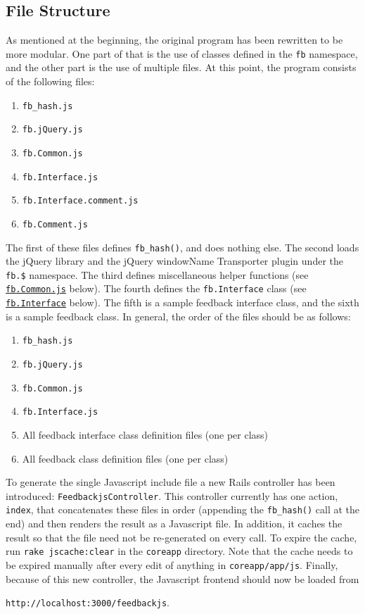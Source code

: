 \documentclass[letterpaper,12pt]{article}
\newcommand{\fb}[1]{\texttt{fb#1}}
\newcommand{\fbhash}[1]{\texttt{fb\_hash#1}}
\newcommand{\code}[1]{{\tt #1}}
\begin{document}
\subsection{File Structure}
\label{sec:init:file structure}
As mentioned at the beginning, the original program has been rewritten to be more modular.  One part of that is the use of classes defined in the \fb{} namespace, and the other part is the use of multiple files.  At this point, the program consists of the following files:
\begin{enumerate}
 \item \code{fb\_hash.js}
 \item \code{fb.jQuery.js}
 \item \code{fb.Common.js}
 \item \code{fb.Interface.js}
 \item \code{fb.Interface.comment.js}
 \item \code{fb.Comment.js}
\end{enumerate}
\noindent The first of these files defines \fbhash{()}, and does nothing else.  The second loads the jQuery library and the jQuery windowName Transporter plugin under the \fb{.\$} namespace.  The third defines miscellaneous helper functions (see \hyperref[sec:fb.Common.js]{\fb{.Common.js}} below).  The fourth defines the \fb{.Interface} class (see \hyperref[sec:fb.Interface]{\fb{.Interface}} below).  The fifth is a sample feedback interface class, and the sixth is a sample feedback class.  In general, the order of the files should be as follows:
\begin{enumerate}
 \item \code{fb\_hash.js}
 \item \code{fb.jQuery.js}
 \item \code{fb.Common.js}
 \item \code{fb.Interface.js}
 \item All feedback interface class definition files (one per class)
 \item All feedback class definition files (one per class)
\end{enumerate}
\noindent To generate the single Javascript include file a new Rails controller has been introduced: \code{FeedbackjsController}.  This controller currently has one action, \code{index}, that concatenates these files in order (appending the \fbhash{()} call at the end) and then renders the result as a Javascript file.  In addition, it caches the result so that the file need not be re-generated on every call.  To expire the cache, run \code{rake jscache:clear} in the \code{coreapp} directory.  Note that the cache needs to be expired manually after every edit of anything in \code{coreapp/app/js}.  Finally, because of this new controller, the Javascript frontend should now be loaded from \begin{center}\code{http://localhost:3000/feedbackjs}.\end{center}
\end{document}
